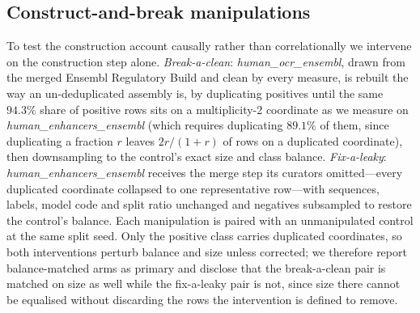 \documentclass[webpdf,modern,large,namedate]{oup-authoring-template}%
\begin{document}
\subsection{Construct-and-break manipulations}\label{sec:m-manip}
To test the construction account causally rather than correlationally we intervene on the construction step alone. \emph{Break-a-clean}: \textit{human\_ocr\_ensembl}, drawn from the merged Ensembl Regulatory Build and clean by every measure, is rebuilt the way an un-deduplicated assembly is, by duplicating positives until the same $94.3\%$ share of positive rows sits on a multiplicity-2 coordinate as we measure on \textit{human\_enhancers\_ensembl} (which requires duplicating $89.1\%$ of them, since duplicating a fraction $r$ leaves $2r/(1+r)$ of rows on a duplicated coordinate), then downsampling to the control's exact size and class balance. \emph{Fix-a-leaky}: \textit{human\_enhancers\_ensembl} receives the merge step its curators omitted---every duplicated coordinate collapsed to one representative row---with sequences, labels, model code and split ratio unchanged and negatives subsampled to restore the control's balance. Each manipulation is paired with an unmanipulated control at the same split seed. Only the positive class carries duplicated coordinates, so both interventions perturb balance and size unless corrected; we therefore report balance-matched arms as primary and disclose that the break-a-clean pair is matched on size as well while the fix-a-leaky pair is not, since size there cannot be equalised without discarding the rows the intervention is defined to remove.
\end{document}
